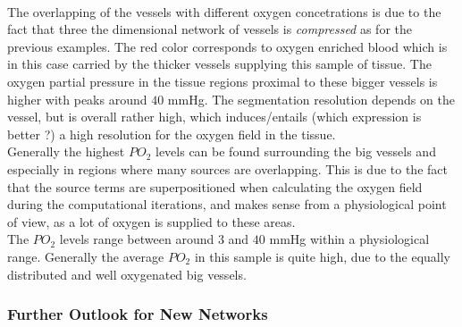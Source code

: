 \\The overlapping of the vessels with different oxygen concetrations is due to the fact that three the dimensional network of vessels is \emph{compressed} as for the previous examples. The red color corresponds to oxygen enriched blood which is in this case carried by the thicker vessels supplying this sample of tissue. The oxygen partial pressure in the tissue regions proximal to these bigger vessels is higher with peaks around $40$ mmHg. The segmentation resolution depends on the vessel, but is overall rather high, which induces/entails {\color{red} (which expression is better ?)} a high resolution for the oxygen field in the tissue.
\\Generally the highest $PO_2$ levels can be found surrounding the big vessels and especially in regions where many sources are overlapping. This is due to the fact that the source terms are superpositioned when calculating the oxygen field during the computational iterations, and makes sense from a physiological point of view, as a lot of oxygen is supplied to these areas.
\\The $PO_2$ levels range between around $3$ and $40$ mmHg within a physiological range. Generally the average $PO_2$ in this sample is quite high, due to the equally distributed and well oxygenated big vessels.

\newpage
\subsubsection*{Further Outlook for New Networks}
\label{Outlook}

